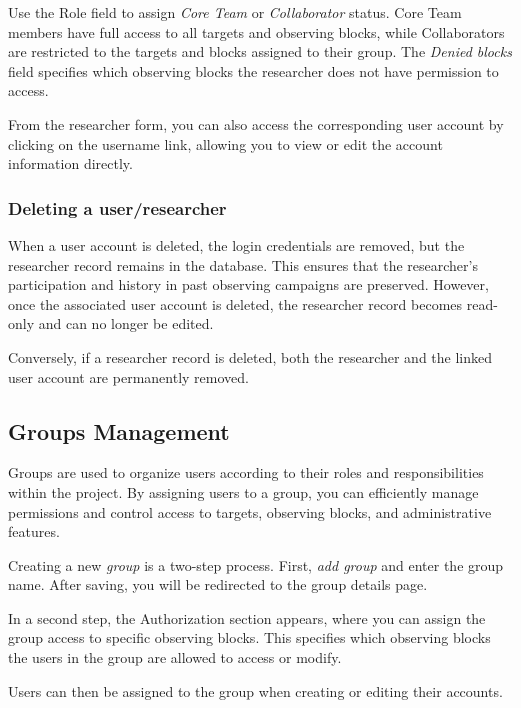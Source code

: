 Use the Role field to assign \textsl{Core Team} or \textsl{Collaborator} status. Core Team members have full access to all targets and observing blocks, while Collaborators are restricted to the targets and blocks assigned to their group. The \textsl{Denied blocks} field specifies which observing blocks the researcher does not have permission to access.


From the researcher form, you can also access the corresponding user account by clicking on the username link, allowing you to view or edit the account information directly.


\subsubsection{Deleting a user/researcher}

When a user account is deleted, the login credentials are removed, but the researcher record remains in the database. This ensures that the researcher’s participation and history in past observing campaigns are preserved. However, once the associated user account is deleted, the researcher record becomes read-only and can no longer be edited. 

\warning Conversely, if a researcher record is deleted, both the researcher and the linked user account are permanently removed.


\subsection{Groups Management}

Groups are used to organize users according to their roles and responsibilities within the project. By assigning users to a group, you can efficiently manage permissions and control access to targets, observing blocks, and administrative features.

Creating a new \textsl{group} is a two-step process. First, \textsl{add group} and enter the group name. After saving, you will be redirected to the group details page. 


In a second step, the Authorization section appears, where you can assign the group access to specific observing blocks. This specifies which observing blocks the users in the group are allowed to access or modify.


Users can then be assigned to the group when creating or editing their accounts.




